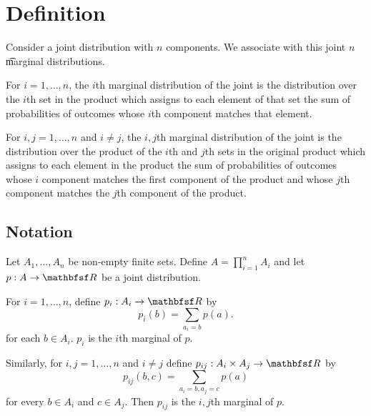 

\section*{Definition}

Consider a joint distribution with $n$ components.
We associate with this joint $n$ \t{marginal distributions}.

For $i = 1, \dots , n$, the \t{$i$th marginal distribution} of the joint is the distribution over the $i$th set in the product which assigns to each element of that set the sum of probabilities of outcomes whose $i$th component matches that element.

For $i,j = 1, \dots , n$ and $i \neq j$, the \t{$i,j$th marginal distribution} of the joint is the distribution over the product of the $i$th and $j$th sets in the original product which assigns to each element in the product the sum of probabilities of outcomes whose $i$ component matches the first component of the product and whose $j$th component matches the $j$th component of the product.

\subsection*{Notation}

Let $A_1, \dots , A_n$ be non-empty finite sets.
Define $A = \prod_{i = 1}^{n} A_i$ and let $p: A \to \R $ be a joint distribution.

For $i = 1, \dots , n$, define $p_i: A_i \to \R $ by
    \[
p_i(b) = \sum_{a_i = b} p(a).
    \]
for each $b \in A_i$.
$p_i$ is the $i$th marginal of $p$.

Similarly, for $i, j = 1, \dots , n$ and $i \neq j$ define $p_{ij}: A_i \times  A_j \to \R $ by
    \[
p_{ij}(b, c) = \sum_{a_i = b, a_j = c} p(a)
    \]
for every $b \in A_i$ and $c \in A_j$.
Then $p_{ij}$ is the $i,j$th marginal of $p$.
